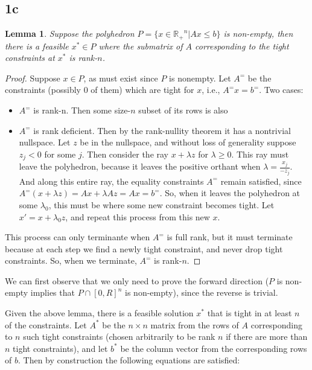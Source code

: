 \documentclass{article}
\newtheorem{lemma}{Lemma}
\begin{document}
\subsection*{1c}

\begin{lemma}
  Suppose the polyhedron $P = \{x \in \mathbb{R_+}^n | Ax \leq b\}$ is
non-empty, then there is a feasible $x^* \in P$ where the submatrix of $A$ corresponding to the tight constraints at $x^*$ is rank-$n$.
\end{lemma}
\begin{proof}
Suppose $x \in P$, as must exist since $P$ is nonempty. Let $A^=$ be the constraints (possibly 0 of them) which are tight for $x$, i.e., $A^=x = b^=$. Two cases:

\begin{itemize}
\item $A^=$ is rank-n. Then some size-$n$ subset of its rows is also 
\item $A^=$ is rank deficient. Then by the rank-nullity theorem it has a
nontrivial nullspace. Let $z$ be in the nullspace, and without loss of
generality suppose $z_j < 0$ for some $j$. Then consider the ray $x + \lambda
z$ for $\lambda \geq 0$. This ray must leave the polyhedron, because it leaves
the positive orthant when $\lambda = \frac{x_j}{-z_j}$. And along this entire
ray, the equality constraints $A^=$ remain satisfied, since $A^=(x + \lambda
z) = Ax + \lambda Az = Ax = b^=$. So, when it leaves the polyhedron at some
$\lambda_0$, this must be where some new constraint becomes tight. Let $x' = x
+ \lambda_0 z$, and repeat this process from this new $x$.
\end{itemize}

This process can only terminante when $A^=$ is full rank, but it must terminate
because at each step we find a newly tight constraint, and never drop tight
constraints. So, when we terminate, $A^=$ is rank-$n$.
 
\end{proof}

We can first observe that we only need to prove the forward direction
($P$ is non-empty implies that $P \cap [0, R]^n$ is non-empty),
since the reverse is trivial. 

Given the above lemma,
there is a feasible solution $x^*$ that is tight in at least $n$
of the constraints. Let $A^*$ be the $n \times n$ matrix from the rows
of $A$ corresponding to $n$ such tight constraints (chosen arbitrarily to be
rank $n$ if there are more than $n$ tight constraints), and let $b^*$ be the
column vector from the corresponding rows of $b$.  Then by construction the
following equations are satisfied:
\end{document}
